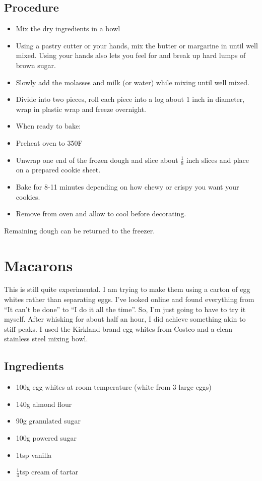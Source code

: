 \documentclass[10pt, openany]{book}
\begin{document}
\subsection{Procedure}
\begin{itemize}
  \item Mix the dry ingredients in a bowl
  \item Using a pastry cutter or your hands, mix the butter or margarine in until well mixed.  Using your hands also lets you feel for and break up hard lumps of brown sugar.
  \item Slowly add the molasses and milk (or water) while mixing until well mixed.
  \item Divide into two pieces, roll each piece into a log about 1 inch in diameter, wrap in plastic wrap and freeze overnight.
  \item When ready to bake:
  \item Preheat oven to 350\degree{}F
  \item Unwrap one end of the frozen dough and slice about $\frac{1}{8}$ inch slices and place on a prepared cookie sheet.
  \item Bake for 8-11 minutes depending on how chewy or crispy you want your cookies.
  \item Remove from oven and allow to cool before decorating.
\end{itemize}
Remaining dough can be returned to the freezer.

\section{Macarons}
This is still quite experimental.  I am trying to make them using a carton of egg whites rather than separating eggs.  I've looked online and found everything from ``It can't be done'' to ``I do it all the time''.  So, I'm just going to have to try it myself.  After whisking for about half an hour, I did achieve something akin to stiff peaks.  I used the Kirkland brand egg whites from Costco and a clean stainless steel mixing bowl.

\subsection{Ingredients}
\begin{itemize}
  \item 100g egg whites at room temperature (white from 3 large eggs)
  \item 140g almond flour
  \item 90g granulated sugar
  \item 100g powered sugar
  \item 1tsp vanilla
  \item $\frac{1}{4}$tsp cream of tartar
\end{itemize}
\end{document}
